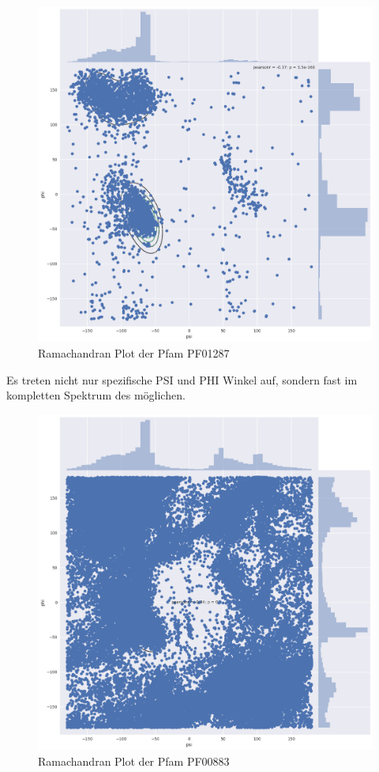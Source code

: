 \begin{figure}
    \centering
    \includegraphics[width=.99\textwidth]{images/ramachandranplot_PF01287.png}
    \caption{Ramachandran Plot der Pfam PF01287}
    \label{fig:ramachandran_PF01287}
\end{figure}


Es treten nicht nur spezifische PSI und PHI Winkel auf, sondern fast im kompletten Spektrum des möglichen.

\begin{figure}
    \centering
    \includegraphics[width=.99\textwidth]{images/ramachandranplot_PF00883.png}
    \caption{Ramachandran Plot der Pfam PF00883}
    \label{fig:ramachandran_PF00883}
\end{figure}





